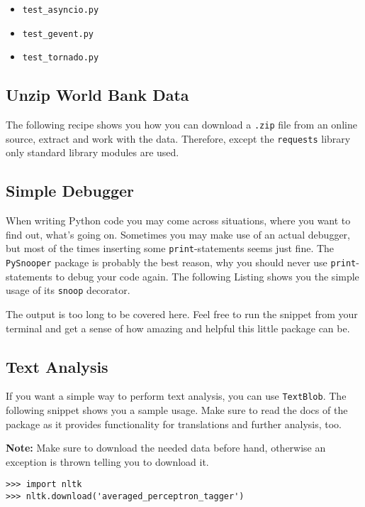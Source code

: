 \begin{itemize}
    \item \lstinline{test_asyncio.py}
    \item \lstinline{test_gevent.py}
    \item \lstinline{test_tornado.py}
\end{itemize}


\subsection{Unzip World Bank Data}

The following recipe shows you how you can download a \lstinline{.zip} file from an online source, extract and work with the data.
Therefore, except the \lstinline{requests} library only standard library modules are used.




\subsection{Simple Debugger}

When writing Python code you may come across situations, where you want to find out, what's going on.
Sometimes you may make use of an actual debugger, but most of the times inserting some \lstinline{print}-statements seems just fine.
The \lstinline{PySnooper} package is probably the best reason, why you should never use \lstinline{print}-statements to debug your code again.
The following Listing shows you the simple usage of its \lstinline{snoop} decorator.



The output is too long to be covered here.
Feel free to run the snippet from your terminal and get a sense of how amazing and helpful this little package can be.


\subsection{Text Analysis}

If you want a simple way to perform text analysis, you can use \lstinline{TextBlob}.
The following snippet shows you a sample usage.
Make sure to read the docs of the package as it provides functionality for translations and further analysis, too.



\textbf{Note:} Make sure to download the needed data before hand, otherwise an exception is thrown telling you to download it.

\begin{lstlisting}[caption=Download data using NLTK]
>>> import nltk
>>> nltk.download('averaged_perceptron_tagger')
\end{lstlisting}
